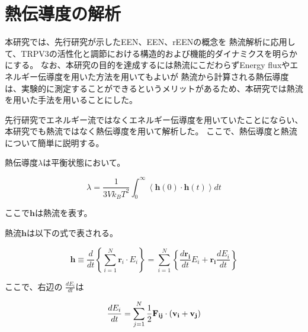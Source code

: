 

\section{熱伝導度の解析}
本研究では、先行研究が示したEEN、\Delta EEN、r\Delta EENの概念\autocite{ishikura_energy_2015,ota_energy_2019,poudel_energy_2022}を
熱流解析に応用して、TRPV3の活性化と調節における構造的および機能的ダイナミクスを明らかにする。
なお、本研究の目的を達成するには熱流にこだわらずEnergy fluxやエネルギー伝導度を用いた方法を用いてもよいが
熱流から計算される熱伝導度は、実験的に測定することができるというメリットがあるため、本研究では熱流を用いた手法を用いることにした。

先行研究でエネルギー流ではなくエネルギー伝導度を用いていたことにならい、本研究でも熱流ではなく熱伝導度を用いて解析した。
ここで、熱伝導度と熱流について簡単に説明する。

熱伝導度$\lambda$は平衡状態において。

\begin{equation}
  \label{eq:thermal_conductivity}
  \lambda = \frac{1}{3Vk_B T^2} \int_{0}^{\infty} \left\langle
    \bm{h}(0) \cdot \bm{h}(t)
  \right\rangle dt
\end{equation}

ここで$\mathbf{h}$は熱流を表す。\autocite{mcquarrie_statistical_2000}

熱流$\mathbf{h}$は以下の式で表される。

\begin{equation}
  \label{eq:heat_flow}
  \bm{h} \equiv \frac{d}{dt} \left\{
    \sum_{i=1}^{N} \bm{r}_i \cdot E_i
  \right\} = \sum_{i=1}^{N} \left\{
    \frac{d\bm{r_i}}{dt}E_i + \bm{r_i}\frac{dE_i}{dt}
  \right\}
\end{equation}

ここで、右辺の $\frac{dE_i}{dt}$は

\begin{equation}
  \label{time_derivative_of_energy}
  \frac{dE_i}{dt} = \sum_{j=1}^{N} \frac{1}{2} \bf{F}_{ij} \cdot (\bf{v}_i + \bf{v}_j)
\end{equation}

